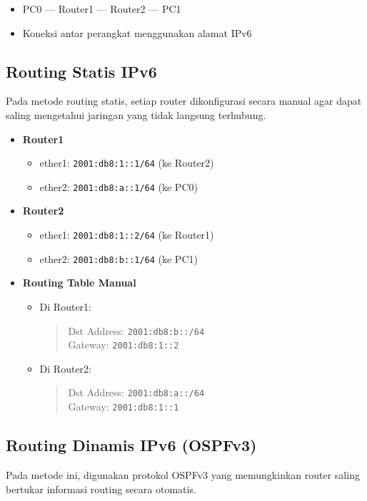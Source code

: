 \begin{itemize}
    \item PC0 --- Router1 --- Router2 --- PC1
    \item Koneksi antar perangkat menggunakan alamat IPv6
\end{itemize}

\subsection{Routing Statis IPv6}
Pada metode routing statis, setiap router dikonfigurasi secara manual agar dapat saling mengetahui jaringan yang tidak langsung terhubung.

\begin{itemize}
    \item \textbf{Router1}
    \begin{itemize}
        \item ether1: \texttt{2001:db8:1::1/64} (ke Router2)
        \item ether2: \texttt{2001:db8:a::1/64} (ke PC0)
    \end{itemize}
    \item \textbf{Router2}
    \begin{itemize}
        \item ether1: \texttt{2001:db8:1::2/64} (ke Router1)
        \item ether2: \texttt{2001:db8:b::1/64} (ke PC1)
    \end{itemize}
    \item \textbf{Routing Table Manual}
    \begin{itemize}
        \item Di Router1:
        \begin{quote}
            Dst Address: \texttt{2001:db8:b::/64} \\
            Gateway: \texttt{2001:db8:1::2}
        \end{quote}
        \item Di Router2:
        \begin{quote}
            Dst Address: \texttt{2001:db8:a::/64} \\
            Gateway: \texttt{2001:db8:1::1}
        \end{quote}
    \end{itemize}
\end{itemize}

\subsection{Routing Dinamis IPv6 (OSPFv3)}
Pada metode ini, digunakan protokol OSPFv3 yang memungkinkan router saling bertukar informasi routing secara otomatis.

